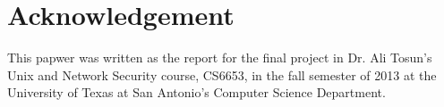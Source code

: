 \section*{Acknowledgement}
This papwer was written as the report for the final project in Dr. Ali Tosun's Unix and Network Security course, CS6653, in the fall semester of 2013 at the University of Texas at San Antonio's Computer Science Department.
